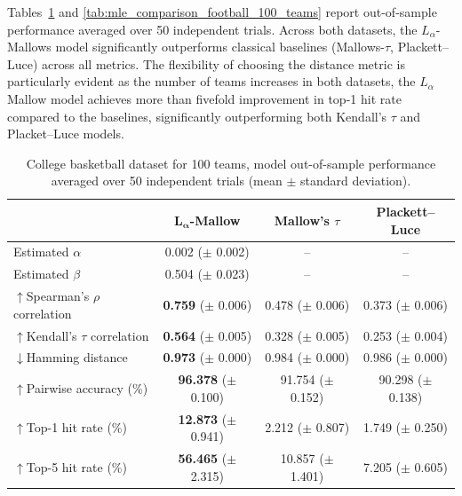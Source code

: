 \documentclass{article}
\begin{document}
Tables~\ref{tab:mle_comparison_basketball_100_teams} and \ref{tab:mle_comparison_football_100_teams} report out-of-sample performance averaged over 50 independent trials. Across both datasets, the $L_\alpha$-Mallows model significantly outperforms classical baselines (Mallows-$\tau$, Plackett--Luce) across all metrics. The flexibility of choosing the distance metric is particularly evident as the number of teams increases in both datasets, the $L_\alpha$ Mallow model achieves more than fivefold improvement in top-1 hit rate compared to the baselines, significantly outperforming both Kendall’s $\tau$ and Placket–Luce models.


\begin{table}[h!]
\centering
\setlength{\tabcolsep}{8pt}
\begin{tabular}{|l|c|c|c|}
\hline
 & \textbf{$\boldsymbol{L}_{\boldsymbol{\alpha}}$-Mallow} &  {Mallow's $\tau$} & {Plackett--Luce} \\
\hline
 Estimated $\alpha$      & 0.002 ($\pm$ 0.002)  & --               & --               \\
 Estimated $\beta$       & 0.504 ($\pm$ 0.023)  & --               & --  
 \\
 \hline
$\uparrow$Spearman's $\rho$ correlation    & \textbf{0.759} ($\pm$ 0.006)  & 0.478 ($\pm$ 0.006)  & 0.373 ($\pm$ 0.006)  \\
$\uparrow$Kendall's $\tau$ correlation    & \textbf{0.564} ($\pm$ 0.005)  & 0.328 ($\pm$ 0.005)  & 0.253 ($\pm$ 0.004)  \\
$\downarrow$Hamming distance     & \textbf{0.973} ($\pm$ 0.000)  & 0.984 ($\pm$ 0.000)  & 0.986 ($\pm$ 0.000)  \\
$\uparrow$Pairwise accuracy (\%)   & \textbf{96.378 }($\pm$ 0.100) & 91.754 ($\pm$ 0.152) & 90.298 ($\pm$ 0.138) \\
$\uparrow$Top-1 hit rate (\%)     & \textbf{12.873} ($\pm$ 0.941) & 2.212 ($\pm$ 0.807)  & 1.749 ($\pm$ 0.250)  \\
$\uparrow$Top-5 hit rate (\%)      & \textbf{56.465 }($\pm$ 2.315) & 10.857 ($\pm$ 1.401) & 7.205 ($\pm$ 0.605)  \\
\hline
\end{tabular}
\caption{College basketball dataset for 100 teams, model out-of-sample performance averaged over 50 independent trials (mean $\pm$ standard deviation).}
\label{tab:mle_comparison_basketball_100_teams}
\end{table}
\end{document}
